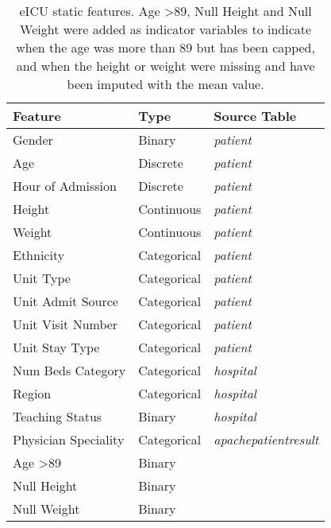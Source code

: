 \documentclass[sigconf]{acmart}
\begin{document}
\begin{table}[h]
    \caption{eICU static features. Age \textgreater 89, Null Height and Null Weight were added as indicator variables to indicate when the age was more than 89 but has been capped, and when the height or weight were missing and have been imputed with the mean value.}
    \label{tab:static}
    \centering
    \begin{tabular}{lll}
        \toprule
        \textbf{Feature} & \textbf{Type} & \textbf{Source Table} \\
        \midrule
        Gender & Binary & \textit{patient} \\
        Age & Discrete & \textit{patient} \\
        Hour of Admission & Discrete & \textit{patient} \\
        Height & Continuous & \textit{patient} \\
        Weight & Continuous & \textit{patient} \\
        Ethnicity & Categorical & \textit{patient} \\
        Unit Type & Categorical & \textit{patient} \\
        Unit Admit Source & Categorical & \textit{patient} \\
        Unit Visit Number & Categorical & \textit{patient} \\
        Unit Stay Type & Categorical & \textit{patient} \\
        Num Beds Category & Categorical & \textit{hospital} \\
        Region & Categorical & \textit{hospital} \\
        Teaching Status & Binary & \textit{hospital} \\
        Physician Speciality & Categorical & \textit{apachepatientresult} \\
        Age \textgreater 89 & Binary & \\
        Null Height & Binary & \\
        Null Weight & Binary & \\
        \bottomrule
    \end{tabular}
\end{table}
\end{document}
